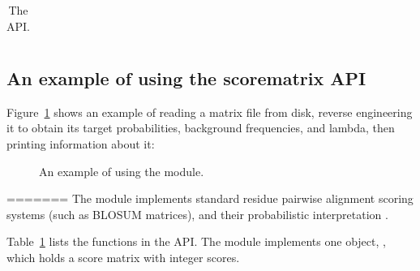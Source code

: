 \begin{table}[hbp]
\begin{center}
{\begin{tabular}{|ll|}

\hline
\end{tabular}
}
\end{center}
\caption{The  API.}
\label{tbl:scorematrix_api}
\end{table}

\subsection{An example of using the scorematrix API}

Figure~\ref{fig:scorematrix_example} shows an example of reading a
matrix file from disk, reverse engineering it \citep{YuAltschul03} to
obtain its target probabilities, background frequencies, and lambda,
then printing information about it:

\begin{figure}

\caption{An example of using the  module.}
\label{fig:scorematrix_example}
\end{figure}
=======
The  module implements standard residue pairwise
alignment scoring systems (such as BLOSUM matrices), and their
probabilistic interpretation \citep{Altschul91,YuAltschul03}.

Table~\ref{tbl:scorematrix_api} lists the functions in the
 API. The module implements one object,
, which holds a score matrix with integer
scores.

